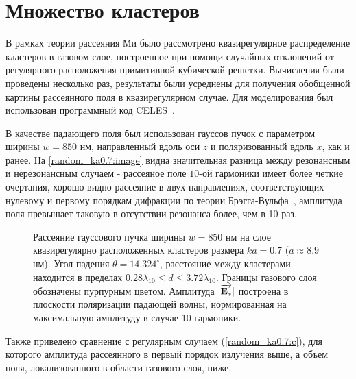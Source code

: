 \section{Множество кластеров}

В рамках теории рассеяния Ми было рассмотрено квазирегулярное распределение кластеров в газовом слое, построенное при помощи случайных отклонений от регулярного расположения примитивной кубической решетки. Вычисления были проведены несколько раз, результаты были усреднены для получения обобщенной картины рассеянного поля в квазирегулярном случае. Для моделирования был использован программный код CELES~\cite{celes}.

В качестве падающего поля был использован гауссов пучок с параметром ширины $w = 850$ нм, направленный вдоль оси $z$ и поляризованный вдоль $x$, как и ранее. На \autoref{random_ka0.7:image} видна значительная разница между резонансным и нерезонансным случаем - рассеяное поле $10$-ой гармоники имеет более четкие очертания, хорошо видно рассеяние в двух направлениях, соответствующих нулевому и первому порядкам дифракции по теории Брэгга-Вульфа~\cite{boren_huffman}, амплитуда поля превышает таковую в отсутствии резонанса более, чем в 10 раз.

\begin{figure}[H]
    \hfil
    \caption{Рассеяние гауссового пучка ширины $w = 850$ нм на слое квазирегулярно расположенных кластеров размера $ka = 0.7$ ($a \approx 8.9$ нм). Угол падения $\theta = 14.324^{\circ}$, расстояние между кластерами находится в пределах $0.28\lambda_{10} \le d \le 3.72\lambda_{10}$. Границы газового слоя обозначены пурпурным цветом. Амплитуда $|\overrightarrow{\textbf{E}_{s}}|$ построена в плоскости поляризации падающей волны, нормированная на максимальную амплитуду в случае 10 гармоники.}
    \label{random_ka0.7:image}
\end{figure}

Также приведено сравнение с регулярным случаем (\autoref{random_ka0.7:c}), для которого амплитуда рассеянного в первый порядок излучения выше, а объем поля, локализованного в области газового слоя, ниже.



